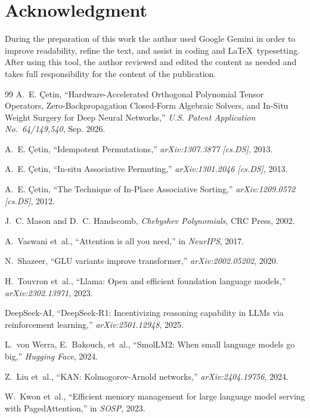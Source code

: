 \documentclass[journal,lettersize]{IEEEtran}
\begin{document}
\section*{Acknowledgment}
{\footnotesize During the preparation of this work the author used Google Gemini in order to improve readability, refine the text, and assist in coding and \LaTeX\ typesetting. After using this tool, the author reviewed and edited the content as needed and takes full responsibility for the content of the publication.}

\footnotesize
\begin{thebibliography}{99}
\setlength{\itemsep}{1pt}
\setlength{\parskip}{0pt}
A.~E. \c{C}etin, ``Hardware-Accelerated Orthogonal Polynomial Tensor Operators, Zero-Backpropagation Closed-Form Algebraic Solvers, and In-Situ Weight Surgery for Deep Neural Networks,'' \emph{U.S. Patent Application No.~64/149,540}, Sep. 2026.

A.~E. \c{C}etin, ``Idempotent Permutations,'' \emph{arXiv:1307.3877 [cs.DS]}, 2013.

A.~E. \c{C}etin, ``In-situ Associative Permuting,'' \emph{arXiv:1301.2046 [cs.DS]}, 2013.

A.~E. \c{C}etin, ``The Technique of In-Place Associative Sorting,'' \emph{arXiv:1209.0572 [cs.DS]}, 2012.

J.~C. Mason and D.~C. Handscomb, \emph{Chebyshev Polynomials}, CRC Press, 2002.

A.~Vaswani et~al., ``Attention is all you need,'' in \emph{NeurIPS}, 2017.

N.~Shazeer, ``GLU variants improve transformer,'' \emph{arXiv:2002.05202}, 2020.

H.~Touvron et~al., ``Llama: Open and efficient foundation language models,'' \emph{arXiv:2302.13971}, 2023.

DeepSeek-AI, ``DeepSeek-R1: Incentivizing reasoning capability in LLMs via reinforcement learning,'' \emph{arXiv:2501.12948}, 2025.

L.~von Werra, E.~Bakouch, et~al., ``SmolLM2: When small language models go big,'' \emph{Hugging Face}, 2024.

Z.~Liu et~al., ``KAN: Kolmogorov-Arnold networks,'' \emph{arXiv:2404.19756}, 2024.

W.~Kwon et~al., ``Efficient memory management for large language model serving with PagedAttention,'' in \emph{SOSP}, 2023.

\end{thebibliography}
\end{document}
